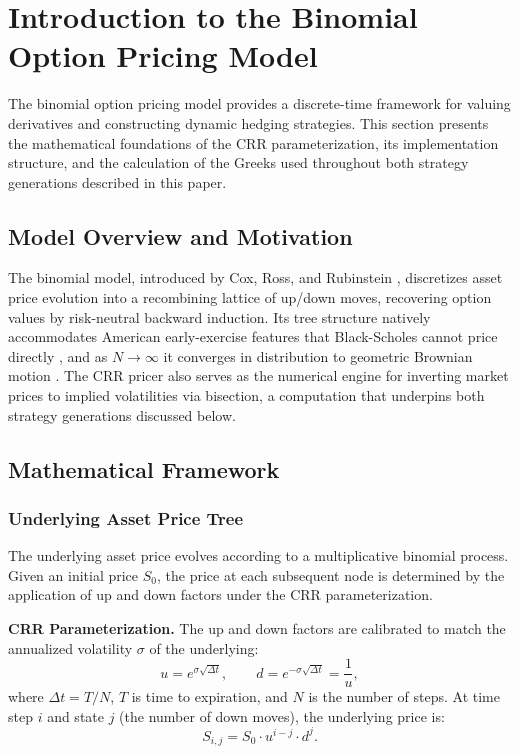 \documentclass[10pt,twocolumn]{article}
\begin{document}
\section{Introduction to the Binomial Option Pricing Model}

The binomial option pricing model provides a discrete-time framework for
valuing derivatives and constructing dynamic hedging strategies. This section
presents the mathematical foundations of the CRR parameterization, its
implementation structure, and the calculation of the Greeks used throughout
both strategy generations described in this paper.

\subsection{Model Overview and Motivation}

The binomial model, introduced by Cox, Ross, and Rubinstein \cite{crr1979},
discretizes asset price evolution into a recombining lattice of up/down moves,
recovering option values by risk-neutral backward induction. Its tree structure natively accommodates American early-exercise features that Black-Scholes cannot
price directly \cite{hull2018}, and as $N \to \infty$ it converges in
distribution to geometric Brownian motion \cite{black1973}. The CRR pricer
also serves as the numerical engine for inverting market prices to implied
volatilities via bisection, a computation that underpins both strategy
generations discussed below.

\subsection{Mathematical Framework}

\subsubsection{Underlying Asset Price Tree}

The underlying asset price evolves according to a multiplicative binomial
process. Given an initial price $S_0$, the price at each subsequent node is
determined by the application of up and down factors under the CRR
parameterization.

\textbf{CRR Parameterization.} The up and down factors are calibrated to
match the annualized volatility $\sigma$ of the underlying:
%
\begin{equation}
u = e^{\sigma \sqrt{\Delta t}}, \qquad d = e^{-\sigma\sqrt{\Delta t}} =
\frac{1}{u},
\end{equation}
%
where $\Delta t = T/N$, $T$ is time to expiration, and $N$ is the number of
steps. At time step $i$ and state $j$ (the number of down moves), the
underlying price is:
%
\begin{equation}
S_{i,j} = S_0 \cdot u^{i-j} \cdot d^{j}.
\end{equation}
\end{document}
